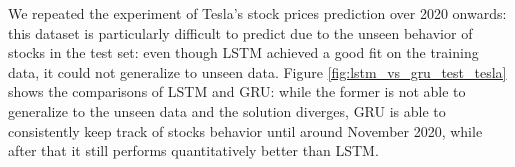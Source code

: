 \documentclass[12pt]{article}
\begin{document}
We repeated the experiment of Tesla's stock prices prediction over 2020 onwards: this dataset is particularly difficult to predict due to the unseen behavior of stocks in the test set: even though LSTM achieved a good fit on the training data, it could not generalize to unseen data.
Figure \ref{fig:lstm_vs_gru_test_tesla} shows the comparisons of LSTM and GRU: while the former is not able to generalize to the unseen data and the solution diverges, GRU is able to consistently keep track of stocks behavior until around November 2020, while after that it still performs quantitatively better than LSTM.



\end{document}
